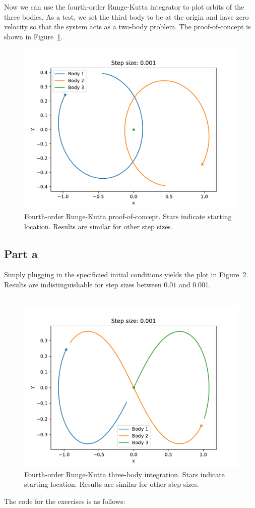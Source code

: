 \documentclass[12pt,a4paper,twoside]{article}
\begin{document}
Now we can use the fourth-order Runge-Kutta integrator to plot orbits of the three bodies. As a test, we set the third body to be at the origin and have zero velocity so that the system acts as a two-body problem. The proof-of-concept is shown in Figure~\ref{fig:circ}.
\begin{figure}[h!]
\centering
\includegraphics[width=.9\textwidth]{figs/exercise03_0_stepsize001.pdf}
\caption{Fourth-order Runge-Kutta proof-of-concept. Stars indicate starting location. Results are similar for other step sizes.} \label{fig:circ}
\end{figure}

\subsection*{Part a}
Simply plugging in the specificied initial conditions yields the plot in Figure~\ref{fig:2a}. Results are indistinguishable for step sizes between $0.01$ and 0.001.\\
\\
\begin{figure}[h!]
\centering
\includegraphics[width=.9\textwidth]{figs/exercise03_1_stepsize001.pdf}
\caption{Fourth-order Runge-Kutta three-body integration. Stars indicate starting location. Results are similar for other step sizes.} \label{fig:2a}
\end{figure}
%
%
The code for the exercises is as follows:
%
%
\end{document}
